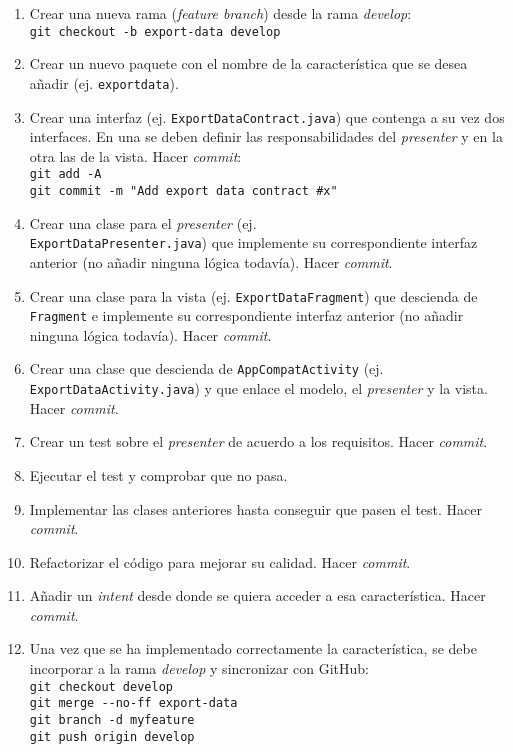 \begin{enumerate}
\def\labelenumi{\arabic{enumi}.}
\tightlist
\item
  Crear una nueva rama (\emph{feature branch}) desde la rama
  \emph{develop}:\\
  \texttt{git\ checkout\ -b\ export-data\ develop}
\item
  Crear un nuevo paquete con el nombre de la característica que se desea
  añadir (ej. \texttt{exportdata}).
\item
  Crear una interfaz (ej. \texttt{ExportDataContract.java}) que contenga
  a su vez dos interfaces. En una se deben definir las responsabilidades
  del \emph{presenter} y en la otra las de la vista. Hacer
  \emph{commit}: \\ 
  \texttt{git\ add\ -A} \\
  \texttt{git\ commit\ -m\ "Add\ export\ data\ contract\ \#x"}
\item
  Crear una clase para el \emph{presenter} (ej.\\
  \texttt{ExportDataPresenter.java}) que implemente su correspondiente
  interfaz anterior (no añadir ninguna lógica todavía). Hacer
  \emph{commit}.
\item
  Crear una clase para la vista (ej. \texttt{ExportDataFragment}) que
  descienda de \texttt{Fragment} e implemente su correspondiente
  interfaz anterior (no añadir ninguna lógica todavía). Hacer
  \emph{commit}.
\item
  Crear una clase que descienda de \texttt{AppCompatActivity} (ej. \\
  \texttt{ExportDataActivity.java}) y que enlace el modelo, el
  \emph{presenter} y la vista. Hacer \emph{commit}.
\item
  Crear un test sobre el \emph{presenter} de acuerdo a los requisitos.
  Hacer \emph{commit}.
\item
  Ejecutar el test y comprobar que no pasa.
\item
  Implementar las clases anteriores hasta conseguir que pasen el test.
  Hacer \emph{commit}.
\item
  Refactorizar el código para mejorar su calidad. Hacer \emph{commit}.
\item
  Añadir un \emph{intent} desde donde se quiera acceder a esa
  característica. Hacer \emph{commit}.
\item
  Una vez que se ha implementado correctamente la característica, se
  debe incorporar a la rama \emph{develop} y sincronizar con GitHub:\\
  \texttt{git\ checkout\ develop}\\
  \texttt{git\ merge\ -\/-no-ff\ export-data}\\
  \texttt{git\ branch\ -d\ myfeature}\\
  \texttt{git\ push\ origin\ develop}
\end{enumerate}

